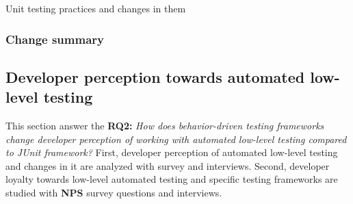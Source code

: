     \begin{table}[H]
            \caption {Unit testing practices and changes in them} \label{tab:changes-pt10}
    \end{table}

\subsubsection{Change summary}

\clearpage


\subsection{Developer perception towards automated low-level testing}
This section answer the
\textbf{RQ2: }\textit{How does behavior-driven testing frameworks change developer perception of working with automated low-level
testing compared to JUnit framework?} First, developer perception of automated low-level testing and changes in it are
analyzed with survey and interviews. Second, developer loyalty towards low-level automated testing and specific testing
frameworks are studied with \textbf{NPS} survey questions and interviews.


